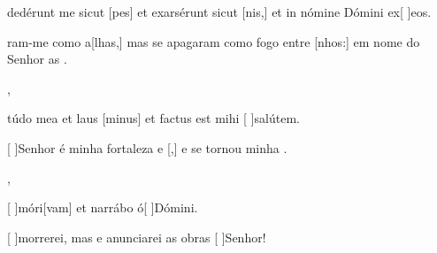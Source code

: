 {  {\item {}dedérunt me sicut [pes] et exarsérunt sicut [nis,] et in nómine Dómini ex[ ]{e}os.}%
    {\item {}ram-me como a[lhas,] mas se apagaram co\-mo fogo entre [nhos:] em nome do Senhor as .},
  {\item {}túdo mea et laus [minus] et factus est mihi [ ]{sa}{lú}tem.}%
    {\item {}[ ]{Se}nhor é minha fortaleza e [,] e se tornou minha .},
  {\item {}[ ]{mó}ri[vam] et narrábo ó[ ]{Dó}mini.}%
    {\item {}[ ]{mor}rerei, mas  e anunciarei as obras [ ]{Se}{\-nhor}!}
}